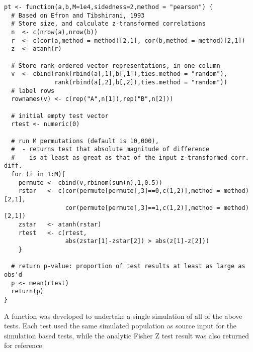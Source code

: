 \begin{lstlisting}[caption={Permutation test}]
pt <- function(a,b,M=1e4,sidedness=2,method = "pearson") {
  # Based on Efron and Tibshirani, 1993
  # Store size, and calculate z-transformed correlations
  n  <- c(nrow(a),nrow(b))
  r  <- c(cor(a,method = method)[2,1], cor(b,method = method)[2,1])
  z  <- atanh(r)
  
  # Store rank-ordered vector representations, in one column
  v  <- cbind(rank(rbind(a[,1],b[,1]),ties.method = "random"),
              rank(rbind(a[,2],b[,2]),ties.method = "random"))
  # label rows
  rownames(v) <- c(rep("A",n[1]),rep("B",n[2]))
  
  # initial empty test vector
  rtest <- numeric(0)
  
  # run M permutations (default is 10,000),
  #  - returns test that absolute magnitude of difference
  #    is at least as great as that of the input z-transformed corr. diff.
  for (i in 1:M){
    permute <- cbind(v,rbinom(sum(n),1,0.5))
    rstar   <- c(cor(permute[permute[,3]==0,c(1,2)],method = method)[2,1],
                 cor(permute[permute[,3]==1,c(1,2)],method = method)[2,1])
    zstar   <- atanh(rstar)
    rtest   <- c(rtest,
                 abs(zstar[1]-zstar[2]) > abs(z[1]-z[2]))
    } 
  
  # return p-value: proportion of test results at least as large as obs'd
  p <- mean(rtest)
  return(p)
}
\end{lstlisting}

A function was developed to undertake a single simulation of all of the above tests.  Each test used the same simulated population as source input for the simulation based tests, while the analytic Fisher Z test result was also returned for reference.

